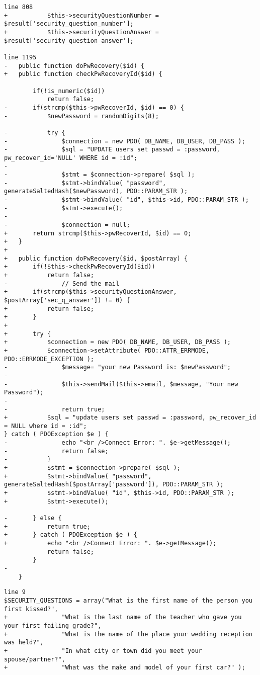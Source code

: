 \begin{lstlisting}[caption = c\_user.php]
line 808
+			$this->securityQuestionNumber = $result['security_question_number'];
+			$this->securityQuestionAnswer = $result['security_question_answer'];
 	
line 1195
-	public function doPwRecovery($id) {
+	public function checkPwRecoveryId($id) {
 		
 		if(!is_numeric($id))
 			return false;
-		if(strcmp($this->pwRecoverId, $id) == 0) {
-			$newPassword = randomDigits(8);
 			
-			try {
-				$connection = new PDO( DB_NAME, DB_USER, DB_PASS );
-				$sql = "UPDATE users set passwd = :password, pw_recover_id='NULL' WHERE id = :id";
-		
-				$stmt = $connection->prepare( $sql );
-				$stmt->bindValue( "password", generateSaltedHash($newPassword), PDO::PARAM_STR );
-				$stmt->bindValue( "id", $this->id, PDO::PARAM_STR );
-				$stmt->execute();
-		
-				$connection = null;
+		return strcmp($this->pwRecoverId, $id) == 0;
+	}
+	
+	public function doPwRecovery($id, $postArray) {
+		if(!$this->checkPwRecoveryId($id)) 
+			return false;
-				// Send the mail
+		if(strcmp($this->securityQuestionAnswer, $postArray['sec_q_answer']) != 0) {
+			return false;
+		}
+		
+		try {
+			$connection = new PDO( DB_NAME, DB_USER, DB_PASS );
+			$connection->setAttribute( PDO::ATTR_ERRMODE, PDO::ERRMODE_EXCEPTION );
-				$message= "your new Password is: $newPassword";
-				
-				$this->sendMail($this->email, $message, "Your new Password");
-				
-				return true;
+			$sql = "update users set passwd = :password, pw_recover_id = NULL where id = :id";
} catch ( PDOException $e ) {
-				echo "<br />Connect Error: ". $e->getMessage();
-				return false;
-			}
+			$stmt = $connection->prepare( $sql );
+			$stmt->bindValue( "password", generateSaltedHash($postArray['password']), PDO::PARAM_STR );
+			$stmt->bindValue( "id", $this->id, PDO::PARAM_STR );
+			$stmt->execute();

-		} else {
+			return true;
+		} catch ( PDOException $e ) {
+			echo "<br />Connect Error: ". $e->getMessage();
 			return false;
 		}
-		
 	}
\end{lstlisting}

\begin{lstlisting}[caption = conf.php]
line 9
$SECURITY_QUESTIONS = array("What is the first name of the person you first kissed?",
+				"What is the last name of the teacher who gave you your first failing grade?",
+				"What is the name of the place your wedding reception was held?",
+				"In what city or town did you meet your spouse/partner?",
+				"What was the make and model of your first car?" );
 
\end{lstlisting}


